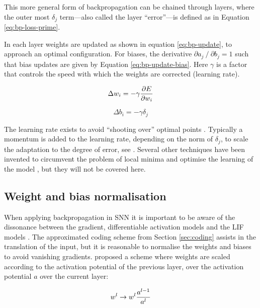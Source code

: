 \documentclass[report.tex]{subfiles}
\begin{document}
This more general form of backpropagation can be chained through layers, where
the outer most $\delta_j$ term---also called the layer ``error''---is defined 
as in Equation \ref{eq:bp-loss-prime}.

In each layer weights are updated as shown in equation \ref{eq:bp-update},
to approach an optimal configuration.
For biases, the derivative $\partial a_j \mathbin{/} \partial b_j = 1$ such that bias
updates are given by Equation \ref{eq:bp-update-bias}.
Here $\gamma$ is a factor that controls the speed with which the weights
are corrected (learning rate). 

\begin{equation}
  \Delta w_i = -\gamma {\partial E \over \partial w_i}
  \label{eq:bp-update}
\end{equation}

\begin{equation}
  \Delta b_i = -\gamma \delta_j
  \label{eq:bp-update-bias}
\end{equation}

The learning rate exists to avoid ``shooting over'' optimal points
\cite{Russel2007}.
Typically a momentum is added to the learning rate, depending on the norm of
$\delta_j$, to scale the adaptation to the degree of error,
see \cite{Sutskever2013, LeCun1998}. 
Several other techniques have been invented to circumvent the problem of 
local minima and optimise the learning of the model \cite{LeCun1998,
Schmidhuber2014}, but they will not be covered here.

\subsection{Weight and bias normalisation}
When applying backpropagation in \gls{SNN} it is important to be aware of the dissonance
between the gradient, differentiable activation models and the LIF models
\cite{Diehl2015, Rueckauer2017}.
The approximated coding scheme from Section \ref{sec:coding} assists in the translation
of the input, but it is reasonable to normalise the weights and biases to avoid vanishing gradients.
\textcite{Rueckauer2017} proposed a scheme where weights are scaled according to the activation
potential of the previous layer, over the activation potential $a$ over the current layer:

\begin{equation}
w^l \rightarrow w^l {a^{l - 1} \over a^l}
\label{eq:weight_norm}
\end{equation}
\end{document}
